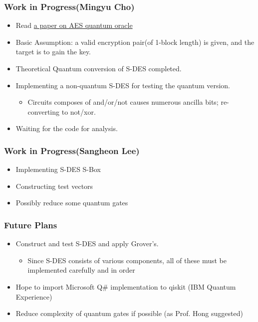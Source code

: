 \documentclass{beamer}
\begin{document}
	\begin{frame}
		\frametitle{Work in Progress(Mingyu Cho)}
		\begin{itemize}
			\item Read \href{https://arxiv.org/pdf/1512.04965.pdf}{a paper on AES quantum oracle}
			\item Basic Assumption: a valid encryption pair(of 1-block length) is given, and the target is to gain the key.
			\item Theoretical Quantum conversion of S-DES completed.
			\item Implementing a non-quantum S-DES for testing the quantum version.
            \begin{itemize}
                \item Circuits composes of and/or/not causes numerous ancilla bits; re-converting to not/xor.
            \end{itemize}
			\item Waiting for the code for analysis.
		\end{itemize}
	\end{frame}
	
	\begin{frame}
		\frametitle{Work in Progress(Sangheon Lee)}
		\begin{itemize}
            \item Implementing S-DES S-Box
            \item Constructing test vectors
			\item Possibly reduce some quantum gates
		\end{itemize}
	\end{frame}
	
	\begin{frame}
		\frametitle{Future Plans}
		\begin{itemize}
			\item Construct and test S-DES and apply Grover's.
            \begin{itemize}
                \item Since S-DES consists of various components, all of these must be implemented carefully and in order
            \end{itemize}
            \item Hope to import Microsoft Q\# implementation to qiskit (IBM Quantum Experience)
            \item Reduce complexity of quantum gates if possible (as Prof. Hong suggested)
		\end{itemize}
	\end{frame}
\end{document}
